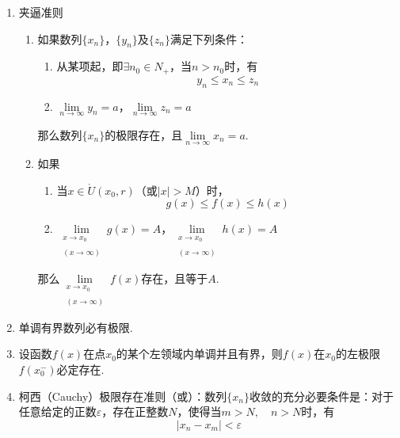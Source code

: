 \begin{note}
	\begin{enumerate}
		\item 夹逼准则
		\begin{enumerate}
			\item 如果数列\( \{x_{n}\} \)，\( \{y_{n}\} \)及\( \{z_{n}\} \)满足下列条件：
			\begin{enumerate}
				\item 从某项起，即\( \exists n_{0} \in N_{+} \)，当\( n > n_{0} \)时，有
				\[ y _{n} \leqslant x_{n} \leqslant z_{n} \]
				\item \( \lim\limits_{n \to \infty}y_{n} = a \)，\( \lim\limits_{n \to \infty}z_{n} = a \)
			\end{enumerate}
			那么数列\( \{x_{n}\} \)的极限存在，且\( \lim\limits_{n \to \infty}x_{n} = a \).
			\item 如果
			\begin{enumerate}
				\item 当\( x \in \mathring{U}(x_{0}, r) \)（或\( |x| > M \)）时，
				\[ g(x) \leqslant f(x) \leqslant h(x) \]
				\item \( \lim\limits_{\substack{x \to x_{0}\\\\(x \to \infty)}}g(x) = A \)，\( \lim\limits_{\substack{x \to x_{0}\\\\(x \to \infty)}}h(x) = A \)
			\end{enumerate}
			那么\( \lim\limits_{\substack{x \to x_{0}\\\\(x \to \infty)}}f(x) \)存在，且等于\( A \).
		\end{enumerate}
		\item 单调有界数列必有极限.
		\item 设函数\( f(x) \)在点\( x_{0} \)的某个左领域内单调并且有界，则\( f(x) \)在\( x_{0} \)的左极限\( f(x_{0}^{-}) \)必定存在.
		\item 柯西（Cauchy）极限存在准则（或）：数列\( \{x_{n}\} \)收敛的{\heiti 充分必要条件}是：对于任意给定的正数\( \varepsilon \)，存在正整数\( N \)，使得当\( m > N,\quad n>N \)时，有
		\[ |x_{n} - x_{m} | < \varepsilon \]
	\end{enumerate}
\end{note}

